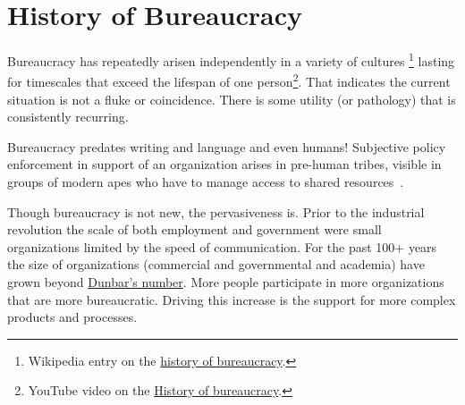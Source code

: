 \section{History of Bureaucracy\label{sec:history}}


Bureaucracy has repeatedly arisen independently in a variety of cultures
\footnote{Wikipedia entry on the \href{https://en.wikipedia.org/wiki/Bureaucracy\%23History}{history of bureaucracy}.}
lasting for timescales that exceed the lifespan of one person\footnote{YouTube video on the \href{https://www.youtube.com/watch?v=B_nsZlcC12g}{History of bureaucracy}.}. That indicates the current situation is not a fluke or coincidence. There is some utility (or pathology) that is consistently recurring. 


Bureaucracy predates writing and language and even humans! Subjective policy enforcement in support of an organization arises in pre-human tribes, visible in groups of modern apes who have to manage access to shared resources~\cite{2016_Suchak}. 



Though bureaucracy is not new, the pervasiveness is. Prior to the industrial revolution the scale of both employment and government were small organizations limited by the speed of communication. For the past 100+ years the size of organizations (commercial and governmental and academia) have grown beyond \href{https://en.wikipedia.org/wiki/Dunbar\%27s_number}{Dunbar's number}. More people participate in more organizations that are more bureaucratic. Driving this increase is the support for more complex products and processes. 




